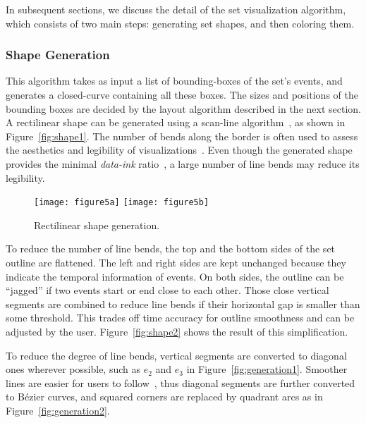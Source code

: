 In subsequent sections, we discuss the detail of the set visualization algorithm, which consists of two main steps: generating set shapes, and then coloring them.

\subsubsection{Shape Generation}
\label{sub:shapesgeneration}
This algorithm takes as input a list of bounding-boxes of the set's events, and generates a closed-curve containing all these boxes. The sizes and positions of the bounding boxes are decided by the layout algorithm described in the next section. A rectilinear shape can be generated using a scan-line algorithm~\cite{Foley1997}, as shown in Figure~\ref{fig:shape1}. The number of bends along the border is often used to assess the aesthetics and legibility of visualizations~\cite{Tanahashi2012}. Even though the generated shape provides the minimal \textit{data-ink} ratio~\cite{Tufte1986}, a large number of line bends may reduce its legibility. 

\begin{figure}[!htb]
	\centering
	{\texttt{[image: figure5a]}}
	\hfill
	{\texttt{[image: figure5b]}}
	\caption{Rectilinear shape generation.}
	\label{fig:shape}
\end{figure}

To reduce the number of line bends, the top and the bottom sides of the set outline are flattened. The left and right sides  are kept unchanged because they indicate the temporal information of events. On both sides, the outline can be ``jagged'' if two events start or end close to each other. Those close vertical segments are combined to reduce line bends if their horizontal gap is smaller than some threshold. This trades off time accuracy for outline smoothness and can be adjusted by the user. Figure~\ref{fig:shape2} shows the result of this simplification. 

To reduce the degree of line bends, vertical segments are converted to diagonal ones wherever possible, such as  $e_2$ and $e_3$ in Figure~\ref{fig:generation1}. Smoother lines are easier for users to follow~\cite{Kim2010}, thus diagonal segments are further converted to B\'{e}zier curves, and squared corners are replaced by quadrant arcs as in Figure~\ref{fig:generation2}.


